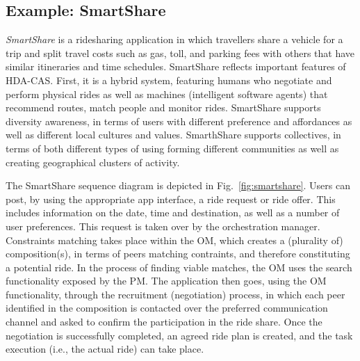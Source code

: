 \subsection{Example: SmartShare}
\textit{SmartShare} is a ridesharing application in which travellers share a vehicle for a trip and split travel costs such as gas, toll, and parking fees with others that have similar itineraries and time schedules. 
SmartShare reflects important features of HDA-CAS. First, it is a hybrid system, featuring humans who negotiate and perform physical rides as well as machines (intelligent software agents) that recommend routes, match people and monitor rides. SmartShare supports diversity awareness, in terms of users with different preference and affordances as well as different local cultures and values. SmarthShare supports collectives, in terms of both different types of using forming different communities as well as creating geographical clusters of activity. 
 

The SmartShare sequence diagram is depicted in Fig.~\ref{fig:smartshare}. Users can post, by using the appropriate app interface, a ride request or ride offer. This includes information on the date, time and destination, as well as a number of user preferences. This request is taken over by the orchestration manager. Constraints matching takes place within the OM, which creates a (plurality of) composition(s), in terms of peers matching contraints, and therefore constituting a potential ride. In the process of finding viable matches, the OM uses the search functionality exposed by the PM. 
The application then goes, using the OM functionality, through the recruitment (negotiation) process, in which each peer identified in the composition is contacted over the preferred communication channel and asked to confirm the participation in the ride share. Once the negotiation is successfully completed, an agreed ride plan is created, and the task execution (i.e., the actual ride) can take place. 

